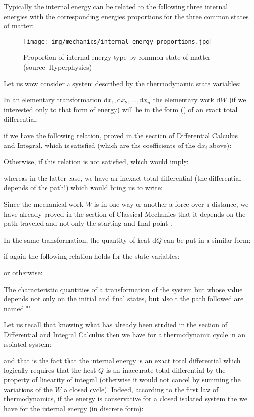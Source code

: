 	Typically the internal energy can be related to the following three internal energies with the corresponding energies proportions for the three common states of matter:
	\begin{figure}[H]
		\centering
		\texttt{[image: img/mechanics/internal\_energy\_proportions.jpg]}
		\caption{Proportion of internal energy type by common state of matter (source: Hyperphysics)}
	\end{figure}
	Let us wow consider a system described by the thermodynamic state variables:
	
	In an elementary transformation $\mathrm{d}x_1,\mathrm{d}x_2,\ldots,\mathrm{d}x_n$ the elementary work $\mathrm{d}W$ (if we interested only to that form of energy) will be in the form () of an exact total differential:
	
	if we have the following relation, proved in the section of Differential Calculus and Integral, which is satisfied (which are the coefficients of the $\mathrm{d}x_i$ above):
	
	Otherwise, if this relation is not satisfied, which would imply:
	
	whereas in the latter case, we have an inexact total differential (the differential depends of the path!) which would bring us to write:
	
	Since the mechanical work $W$ is in one way or another a force over a distance, we have already proved in the section of Classical Mechanics that it depends on the path traveled and not only the starting and final point .

	In the same transformation, the quantity of heat $\mathrm{d}Q$ can be put in a similar form:
	
	if again the following relation holds for the state variables:
	
	or otherwise:
	
	The characteristic quantities of a transformation of the system but whose value depends not only on the initial and final states, but also t the path followed are named "".
	
	Let us recall that knowing what has already been studied in the section of Differential and Integral Calculus then we have for a thermodynamic cycle in an isolated system:
	
	and that is the fact that the internal energy is an exact total differential which logically requires that the heat $Q$ is an inaccurate total differential by the property of linearity of integral (otherwise it would not cancel by summing the variations of the $W$ a closed cycle). Indeed, according to the first law of thermodynamics, if the energy is conservative for a closed isolated system the we have for the internal energy (in discrete form):
	
